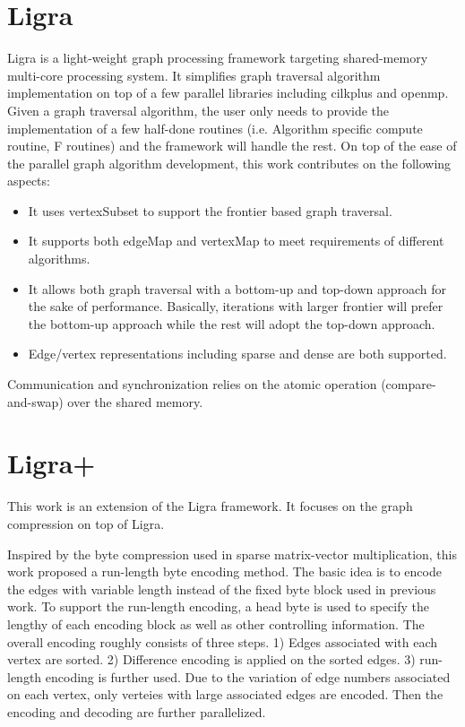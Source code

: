 \section{Ligra}
Ligra \cite{Shun2013ligra} is a light-weight graph processing framework
targeting shared-memory multi-core processing system. It simplifies graph
traversal algorithm implementation on top of a few parallel libraries including
cilkplus and openmp. Given a graph traversal algorithm, the user only needs to
provide the implementation of a few half-done routines (i.e. Algorithm specific
compute routine, F routines) and the framework will handle the rest. On top of
the ease of the parallel graph algorithm development, this work contributes on
the following aspects:
\begin{itemize}
    \item It uses vertexSubset to support the frontier based graph traversal. 
    \item It supports both edgeMap and vertexMap to meet requirements of
        different algorithms.
    \item It allows both graph traversal with a bottom-up and top-down approach
        for the sake of performance. Basically, iterations with larger frontier
        will prefer the bottom-up approach while the rest will adopt the
        top-down approach. 
    \item Edge/vertex representations including sparse and dense are both
        supported.
\end{itemize}

Communication and synchronization relies on the atomic operation
(compare-and-swap) over the shared memory. 

\section{Ligra+}
This work \cite{Shun2015ligra+} is an extension of the Ligra framework. It
focuses on the graph compression on top of Ligra.

Inspired by the byte compression used in sparse matrix-vector multiplication,
this work proposed a run-length byte encoding method. The basic idea is to
encode the edges with variable length instead of the fixed byte block used in
previous work. To support the run-length encoding, a head byte is used to
specify the lengthy of each encoding block as well as other controlling
information. The overall encoding roughly consists of three steps. 1) Edges
associated with each vertex are
sorted. 2) Difference encoding is applied on the sorted edges. 3) run-length
encoding is further used. Due to the variation of edge numbers associated on
each vertex, only verteies with large associated edges are encoded. Then the encoding
and decoding are further parallelized. 
